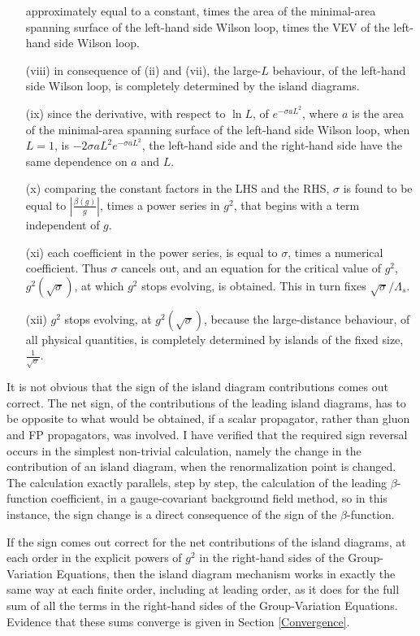 \documentclass[a4paper,12pt,oneside]{article}
\begin{document}
\begin{itemize}
approximately equal to a constant, times the area of the minimal-area
spanning surface of the left-hand side Wilson loop, times the VEV of the
left-hand side Wilson loop.
\item[(viii)] in consequence of (ii) and (vii), the large-$L$ behaviour, of the
left-hand side Wilson loop, is completely determined by the island diagrams.
\item[(ix)] since the derivative, with respect to $\ln L$, of $e^{-\sigma aL^2}$,
where $a$ is the area of the minimal-area spanning surface of the left-hand
side Wilson loop, when $L=1$, is $-2\sigma aL^2e^{-\sigma aL^2}$, the
left-hand side and the right-hand side have the same dependence on $a$ and $L$.
\item[(x)] comparing the constant factors in the LHS and the RHS, $\sigma$ is found to
be equal to $\left|\frac{\beta(g)}{g}\right|$, times a power series in $g^2$, that begins with
a term independent of $g$.
\item[(xi)] each coefficient in the power series, is equal to $\sigma$, times a
numerical coefficient.  Thus $\sigma$ cancels out, and an equation for the
critical value of $g^2$, $g^2(\sqrt{\sigma})$, at which $g^2$ stops
evolving, is obtained.  This in turn fixes $\sqrt{\sigma}/\Lambda_s$.
\item[(xii)] $g^2$ stops evolving, at $g^2(\sqrt{\sigma})$, because the
large-distance behaviour, of all physical quantities, is completely
determined by islands of the fixed size, $\frac{1}{\sqrt{\sigma}}$.
\end{itemize}

It is not obvious that the sign of the island diagram contributions comes
out correct.  The net sign, of the contributions of the leading island
diagrams, has to be opposite to what would be obtained, if a scalar
propagator, rather than gluon and FP propagators, was involved.  I have
verified that the required sign reversal occurs in the simplest non-trivial
calculation, namely the change in the contribution of an island diagram,
when the renormalization point is changed.  The calculation exactly
parallels, step by step, the calculation of the leading $\beta$-function
coefficient, in a gauge-covariant background field method, so in this
instance, the sign change is a direct consequence of the sign of the $\beta$-function.

If the sign comes out correct for the net contributions of the island 
diagrams, at each order in the explicit powers of $g^2$ in
the right-hand sides of the Group-Variation Equations, then the island
diagram mechanism works in exactly the same way at each finite order, including at 
leading order, as it does for the full sum of all the terms in the
right-hand sides of the Group-Variation Equations.  Evidence that these
sums converge is given in Section \ref{Convergence}.
\end{document}
